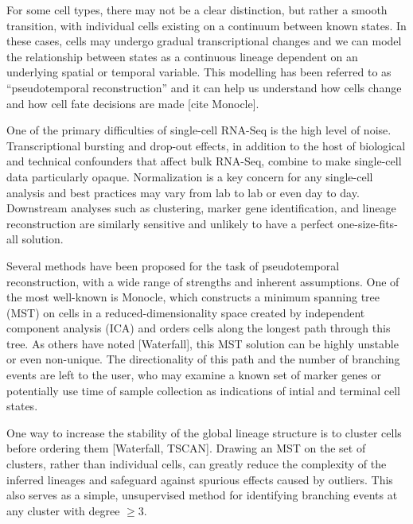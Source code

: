\documentclass[11pt]{article}\usepackage[]{graphicx}\usepackage[]{color}
\begin{document}
For some cell types, there may not be a clear distinction, but rather a smooth transition, with individual cells existing on a continuum between known states. In these cases, cells may undergo gradual transcriptional changes and we can model the relationship between states as a continuous lineage dependent on an underlying spatial or temporal variable. This modelling has been referred to as ``pseudotemporal reconstruction'' and it can help us understand how cells change and how cell fate decisions are made [cite Monocle].

One of the primary difficulties of single-cell RNA-Seq is the high level of noise. Transcriptional bursting and drop-out effects, in addition to the host of biological and technical confounders that affect bulk RNA-Seq, combine to make single-cell data particularly opaque. Normalization is a key concern for any single-cell analysis and best practices may vary from lab to lab or even day to day. Downstream analyses such as clustering, marker gene identification, and lineage reconstruction are similarly sensitive and unlikely to have a perfect one-size-fits-all solution. 

Several methods have been proposed for the task of pseudotemporal reconstruction, with a wide range of strengths and inherent assumptions. One of the most well-known is Monocle, which constructs a minimum spanning tree (MST) on cells in a reduced-dimensionality space created by independent component analysis (ICA) and orders cells along the longest path through this tree. As others have noted [Waterfall], this MST solution can be highly unstable or even non-unique. The directionality of this path and the number of branching events are left to the user, who may examine a known set of marker genes or potentially use time of sample collection as indications of intial and terminal cell states.


One way to increase the stability of the global lineage structure is to cluster cells before ordering them [Waterfall, TSCAN]. Drawing an MST on the set of clusters, rather than individual cells, can greatly reduce the complexity of the inferred lineages and safeguard against spurious effects caused by outliers. This also serves as a simple, unsupervised method for identifying branching events at any cluster with degree $\geq 3$.
\end{document}
